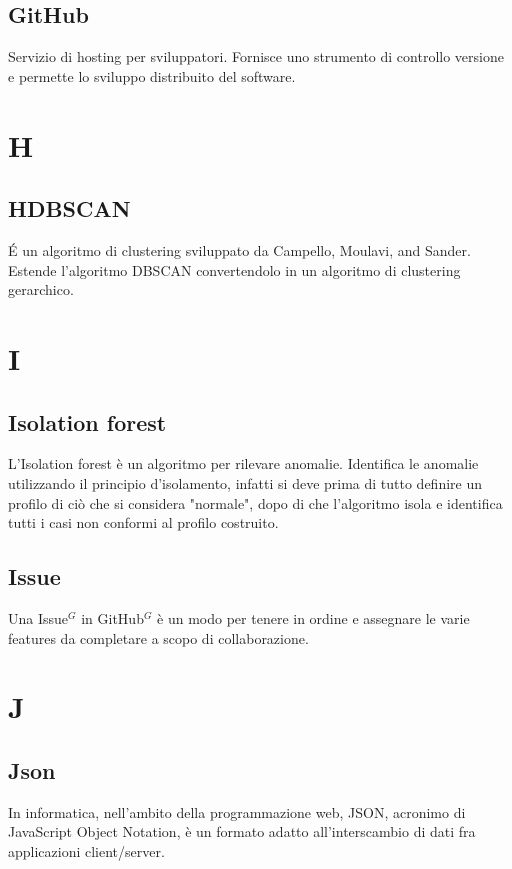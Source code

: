 \subsection{GitHub}
Servizio di hosting per sviluppatori. Fornisce uno strumento di controllo versione e permette lo sviluppo distribuito del software.

\newpage
\section{H}
\subsection{HDBSCAN}
\'E un algoritmo di clustering sviluppato da Campello, Moulavi, and Sander. Estende l'algoritmo DBSCAN convertendolo in un algoritmo di clustering gerarchico.

\newpage
\section{I}
\subsection{Isolation forest}
L'Isolation forest è un algoritmo per rilevare anomalie. Identifica le anomalie utilizzando il principio d'isolamento, infatti si deve prima di tutto definire un profilo di ciò che si considera "normale", dopo di che l'algoritmo isola e identifica tutti i casi non conformi al profilo costruito. 

\subsection{Issue}
Una Issue$^{G}$ in GitHub$^{G}$ è un modo per tenere in ordine e assegnare le varie features da completare a scopo di collaborazione.

\newpage
\section{J}
\subsection{Json}
In informatica, nell'ambito della programmazione web, JSON, acronimo di JavaScript Object Notation, è un formato adatto all'interscambio di dati fra applicazioni client/server.


